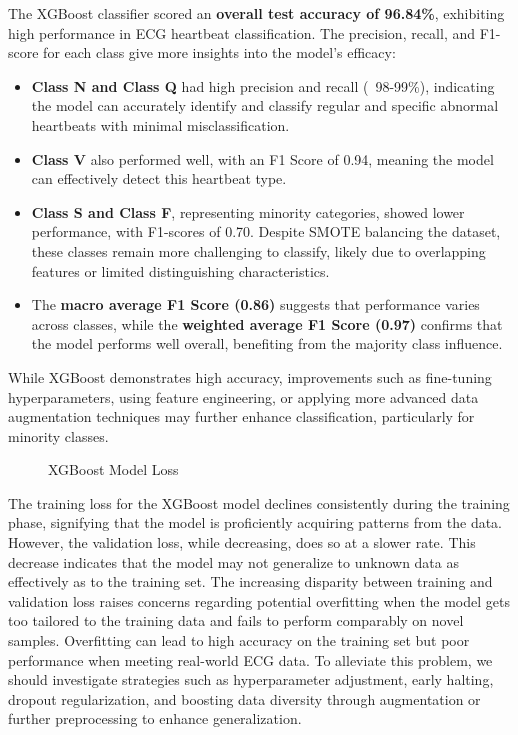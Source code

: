\indent 
The XGBoost classifier scored an \textbf{overall test accuracy of 96.84\%}, exhibiting high performance in ECG heartbeat classification. The precision, recall, and F1-score for each class give more insights into the model's efficacy:
\begin{itemize}
    \item \textbf{Class N and Class Q} had high precision and recall (~98-99\%), indicating the model can accurately identify and classify regular and specific abnormal heartbeats with minimal misclassification.
    \item \textbf{Class V} also performed well, with an F1 Score of 0.94, meaning the model can effectively detect this heartbeat type.
    \item \textbf{Class S and Class F}, representing minority categories, showed lower performance, with F1-scores of 0.70. Despite SMOTE balancing the dataset, these classes remain more challenging to classify, likely due to overlapping features or limited distinguishing characteristics.
    \item The \textbf{macro average F1 Score (0.86)} suggests that performance varies across classes, while the \textbf{weighted average F1 Score (0.97)} confirms that the model performs well overall, benefiting from the majority class influence.
\end{itemize}

\indent While XGBoost demonstrates high accuracy, improvements such as fine-tuning hyperparameters, using feature engineering, or applying more advanced data augmentation techniques may further enhance classification, particularly for minority classes.

\begin{figure}[H]
    \centering
        
    \caption{XGBoost Model Loss}
    \label{fig:XGBoostLoss}
\end{figure}

\indent The training loss for the XGBoost model declines consistently during the training phase, signifying that the model is proficiently acquiring patterns from the data.  However, the validation loss, while decreasing, does so at a slower rate.  This decrease indicates that the model may not generalize to unknown data as effectively as to the training set.  The increasing disparity between training and validation loss raises concerns regarding potential overfitting when the model gets too tailored to the training data and fails to perform comparably on novel samples.  Overfitting can lead to high accuracy on the training set but poor performance when meeting real-world ECG data.  To alleviate this problem, we should investigate strategies such as hyperparameter adjustment, early halting, dropout regularization, and boosting data diversity through augmentation or further preprocessing to enhance generalization.
 
